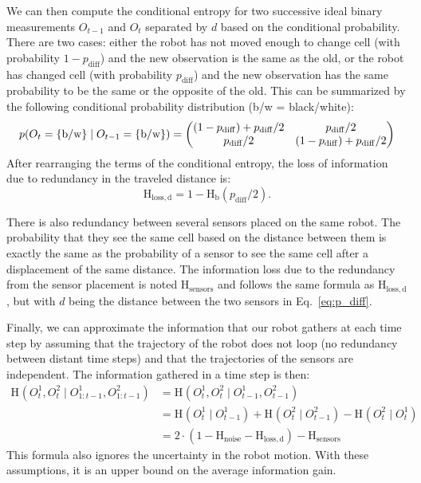 \documentclass{svmult}
\newcommand{\eq}[1]{Eq.~\ref{eq:#1}}
\newcommand{\ent}[1]{\mathrm{H}_\mathrm{#1}} %
\begin{document}
We can then compute the conditional entropy for two successive ideal binary measurements $O_{t-1}$ and $O_t$ separated by $d$ based on the conditional probability.
There are two cases: either the robot has not moved enough to change cell (with probability $1 - p_\mathrm{diff}$) and the new observation is the same as the old, or the robot has changed cell (with probability $p_\mathrm{diff}$) and the new observation has the same probability to be the same or the opposite of the old.
This can be summarized by the following conditional probability distribution ({b/w} = {black/white}):
\begin{equation} \label{eq:p_O_ttm1}
	p(O_t=\{\mathrm{b}/\mathrm{w}\} \mid O_{t-1}=\{\mathrm{b}/\mathrm{w}\})\\
	= \begin{pmatrix}
		(1 - p_\mathrm{diff}) + p_\mathrm{diff}/2 & p_\mathrm{diff}/2\\
		p_\mathrm{diff}/2 & (1 - p_\mathrm{diff}) + p_\mathrm{diff}/2
	\end{pmatrix}
\end{equation}
After rearranging the terms of the conditional entropy, the loss of information due to redundancy in the traveled distance is:
\begin{equation} \label{eq:H_loss}
	\ent{loss,d} = 1 - \ent{b}(p_\mathrm{diff}/2).
\end{equation}

There is also redundancy between several sensors placed on the same robot.
The probability that they see the same cell based on the distance between them is exactly the same as the probability of a sensor to see the same cell after a displacement of the same distance.
The information loss due to the redundancy from the sensor placement is noted $\ent{sensors}$ and follows the same formula as $\ent{loss,d}$, but with $d$ being the distance between the two sensors in \eq{p_diff}.

Finally, we can approximate the information that our robot gathers at each time step by assuming that the trajectory of the robot does not loop (no redundancy between distant time steps) and that the trajectories of the sensors are independent. 
The information gathered in a time step is then:
\begin{equation} \label{eq:H_O}
\begin{split}
	\ent{}(O^1_t, O^2_t \mid O^1_{1:t-1}, O^2_{1:t-1}) &= \ent{}(O^1_t, O^2_t \mid O^1_{t-1}, O^2_{t-1}) \\
	&= \ent{}(O^1_t \mid O^1_{t-1}) + \ent{}(O^2_t \mid O^2_{t-1}) - \ent{}(O^2_t \mid O^1_t) \\
	&= 2\cdot(1-\ent{noise}-\ent{loss,d}) - \ent{sensors}%
\end{split}
\end{equation}
This formula also ignores the uncertainty in the robot motion.
With these assumptions, it is an upper bound on the average information gain.
\end{document}

